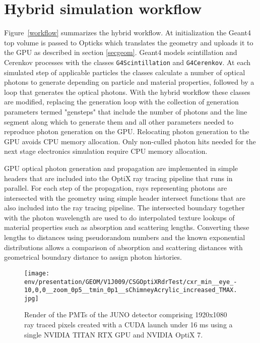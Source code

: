 \documentclass{webofc}
\begin{document}
\section{Hybrid simulation workflow}%
\label{secworkflow}%
%
Figure~\ref{workflow} summarizes the hybrid workflow. 
At initialization the Geant4 top volume is passed to Opticks
which translates the geometry and uploads it to the GPU as described in section \ref{secgeom}.
%
Geant4 models scintillation and Cerenkov processes with the classes {\tt G4Scintillation} and {\tt G4Cerenkov}. 
At each simulated step of applicable particles the classes calculate a number of optical photons 
to generate depending on particle and material properties, followed by a loop that generates the optical photons. 
With the hybrid workflow these classes are modified, replacing the generation loop with the collection of 
generation parameters termed "gensteps" that include the number of photons and the line segment along which to generate them and all
other parameters needed to reproduce photon generation on the GPU. Relocating photon generation to the
GPU avoids CPU memory allocation. Only non-culled photon hits needed for the next stage electronics 
simulation require CPU memory allocation. 

GPU optical photon generation and propagation are implemented in simple headers that are included
into the OptiX ray tracing pipeline that runs in parallel. 
For each step of the propagation, rays representing photons are intersected
with the geometry using simple header intersect functions that are also included into the ray tracing pipeline.
The intersected boundary together with the photon wavelength are used to do interpolated texture lookups of
material properties such as absorption and scattering lengths.
Converting these lengths to distances using pseudorandom numbers and 
the known exponential distributions allows a comparison of absorption and scattering distances 
with geometrical boundary distance to assign photon histories. 
%
%
\begin{figure}
\centering
\texttt{[image: env/presentation/GEOM/V1J009/CSGOptiXRdrTest/cxr\_min\_\_eye\_-10,0,0\_\_zoom\_0p5\_\_tmin\_0p1\_\_sChimneyAcrylic\_increased\_TMAX.jpg]}
\caption{Render of the PMTs of the JUNO detector comprising 1920x1080 ray traced pixels created with a CUDA launch under 16 ms 
using a single NVIDIA TITAN RTX GPU and NVIDIA OptiX 7.
\label{j1808}}
\vspace{-5mm}
\end{figure}
%
\end{document}
